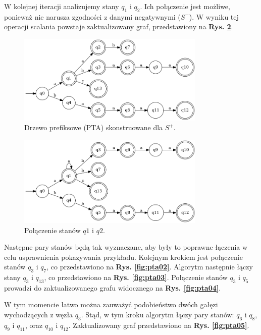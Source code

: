 W kolejnej iteracji analizujemy stany \( q_1 \) i \( q_2 \). Ich połączenie jest możliwe, ponieważ nie narusza zgodności z danymi negatywnymi (\( S^- \)). W wyniku tej operacji scalania powstaje zaktualizowany graf, przedstawiony na \textbf{Rys. \ref{fig:pta01}}.

\begin{figure}[ht]
    \centering
    \includegraphics[width=0.8\textwidth]{images/pta00.png}
    \caption{Drzewo prefiksowe (PTA) skonstruowane dla \( S^+ \).}
    \label{fig:pta00}
\end{figure}

\begin{figure}[ht]
    \centering
    \includegraphics[width=0.8\textwidth]{images/pta01.png}
    \caption{Połączenie stanów \( q1 \) i \( q2 \).}
    \label{fig:pta01}
\end{figure} 

Następne pary stanów będą tak wyznaczane, aby były to poprawne łączenia w celu usprawnienia pokazywania przykładu. Kolejnym krokiem jest połączenie stanów \( q_3 \) i \( q_7 \), co przedstawiono na \textbf{Rys. \ref{fig:pta02}}. Algorytm następnie łączy stany \( q_3 \) i \( q_{13} \), co przedstawiono na \textbf{Rys. \ref{fig:pta03}}. Połączenie stanów \( q_3 \) i \( q_5 \) prowadzi do zaktualizowanego grafu widocznego na \textbf{Rys. \ref{fig:pta04}}. 

W tym momencie łatwo można zauważyć podobieństwo dwóch gałęzi wychodzących z węzła \( q_3 \). Stąd, w tym kroku algorytm łączy pary stanów: \( q_6 \) i \( q_8 \), \( q_9 \) i \( q_{11} \), oraz \( q_{10} \) i \( q_{12} \). Zaktualizowany graf przedstawiono na \textbf{Rys. \ref{fig:pta05}}. 


